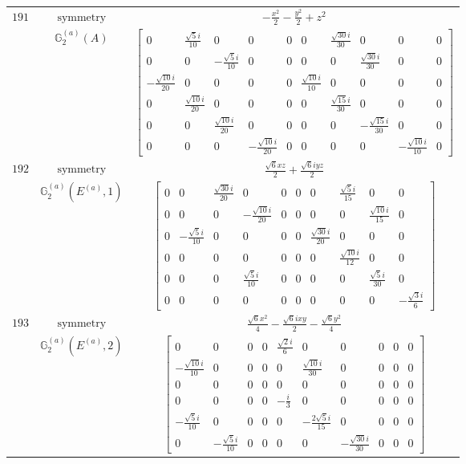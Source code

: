 \documentclass[fleqn,8pt,landscape]{jsarticle}
\begin{document}
\begin{longtable}{ccc}
$ 191 $ & $ \text{symmetry} $ & $ - \frac{x^{2}}{2} - \frac{y^{2}}{2} + z^{2} $ \\
$  $ & $ \mathbb{G}_{2}^{(a)}(A) $ & $ \begin{bmatrix} 0 & \frac{\sqrt{5} i}{10} & 0 & 0 & 0 & 0 & \frac{\sqrt{30} i}{30} & 0 & 0 & 0 \\ 0 & 0 & - \frac{\sqrt{5} i}{10} & 0 & 0 & 0 & 0 & \frac{\sqrt{30} i}{30} & 0 & 0 \\ - \frac{\sqrt{10} i}{20} & 0 & 0 & 0 & 0 & \frac{\sqrt{10} i}{10} & 0 & 0 & 0 & 0 \\ 0 & \frac{\sqrt{10} i}{20} & 0 & 0 & 0 & 0 & \frac{\sqrt{15} i}{30} & 0 & 0 & 0 \\ 0 & 0 & \frac{\sqrt{10} i}{20} & 0 & 0 & 0 & 0 & - \frac{\sqrt{15} i}{30} & 0 & 0 \\ 0 & 0 & 0 & - \frac{\sqrt{10} i}{20} & 0 & 0 & 0 & 0 & - \frac{\sqrt{10} i}{10} & 0 \end{bmatrix} $ \\ \hline
$ 192 $ & $ \text{symmetry} $ & $ \frac{\sqrt{6} x z}{2} + \frac{\sqrt{6} i y z}{2} $ \\
$  $ & $ \mathbb{G}_{2}^{(a)}(E^{(a)},1) $ & $ \begin{bmatrix} 0 & 0 & \frac{\sqrt{30} i}{20} & 0 & 0 & 0 & 0 & \frac{\sqrt{5} i}{15} & 0 & 0 \\ 0 & 0 & 0 & - \frac{\sqrt{10} i}{20} & 0 & 0 & 0 & 0 & \frac{\sqrt{10} i}{15} & 0 \\ 0 & - \frac{\sqrt{5} i}{10} & 0 & 0 & 0 & 0 & \frac{\sqrt{30} i}{20} & 0 & 0 & 0 \\ 0 & 0 & 0 & 0 & 0 & 0 & 0 & \frac{\sqrt{10} i}{12} & 0 & 0 \\ 0 & 0 & 0 & \frac{\sqrt{5} i}{10} & 0 & 0 & 0 & 0 & \frac{\sqrt{5} i}{30} & 0 \\ 0 & 0 & 0 & 0 & 0 & 0 & 0 & 0 & 0 & - \frac{\sqrt{3} i}{6} \end{bmatrix} $ \\ \hline
$ 193 $ & $ \text{symmetry} $ & $ \frac{\sqrt{6} x^{2}}{4} - \frac{\sqrt{6} i x y}{2} - \frac{\sqrt{6} y^{2}}{4} $ \\
$  $ & $ \mathbb{G}_{2}^{(a)}(E^{(a)},2) $ & $ \begin{bmatrix} 0 & 0 & 0 & 0 & \frac{\sqrt{2} i}{6} & 0 & 0 & 0 & 0 & 0 \\ - \frac{\sqrt{10} i}{10} & 0 & 0 & 0 & 0 & \frac{\sqrt{10} i}{30} & 0 & 0 & 0 & 0 \\ 0 & 0 & 0 & 0 & 0 & 0 & 0 & 0 & 0 & 0 \\ 0 & 0 & 0 & 0 & - \frac{i}{3} & 0 & 0 & 0 & 0 & 0 \\ - \frac{\sqrt{5} i}{10} & 0 & 0 & 0 & 0 & - \frac{2 \sqrt{5} i}{15} & 0 & 0 & 0 & 0 \\ 0 & - \frac{\sqrt{5} i}{10} & 0 & 0 & 0 & 0 & - \frac{\sqrt{30} i}{30} & 0 & 0 & 0 \end{bmatrix} $ \\ \hline

\end{longtable}
\end{document}
